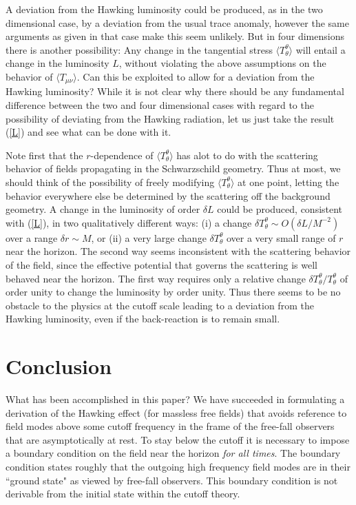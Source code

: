 \documentclass[12pt]{article}
\def\la{\langle}
\def\ra{\rangle}
\begin{document}
A deviation from the Hawking luminosity could be produced,
as in the two dimensional case, by a deviation from the
usual trace anomaly, however the same arguments as given
in that case make this seem unlikely. But in four dimensions
there is another possibility: Any change in
the tangential stress $\la T_\theta^\theta\ra$ will entail
a change in the luminosity $L$, without violating the above
assumptions on the behavior of $\la T_{\mu\nu}\ra$.
Can this be exploited to allow for a deviation from the Hawking
luminosity? While it is not clear why there should be any fundamental
difference between the two and four dimensional cases with regard
to the possibility of deviating from the Hawking radiation, let us
just take the result (\ref{L}) and see what can be done with it.

Note first that the $r$-dependence of $\la T_\theta^\theta\ra$
has alot to do with the scattering behavior of fields propagating in
the Schwarzschild geometry. Thus at most, we should think of the
possibility of freely modifying $\la T_\theta^\theta\ra$ at one
point, letting the behavior everywhere else be determined by
the scattering off the background geometry.
A change in the luminosity of order $\delta L$
could be produced, consistent with (\ref{L}),
in two qualitatively different
ways: (i) a change $\delta T_\theta^\theta\sim
O(\delta L/M^{-2})$ over a range $\delta r\sim M$,
or (ii) a very large change $\delta T_\theta^\theta$
over a very small range of $r$ near the horizon.
The second way seems inconsistent with the scattering
behavior of the field, since the effective potential that governs
the scattering is well behaved near the horizon. The first way
requires only a relative change
$\delta T_\theta^\theta/T_\theta^\theta$
of order unity to change the luminosity by order unity.
Thus there seems to be no obstacle to the physics at the cutoff
scale leading to a deviation from the Hawking luminosity, even if
the back-reaction is to remain small.

\section{Conclusion}
\label{sec:7}

What has been accomplished in this paper? We have
succeeded in formulating a derivation of the Hawking
effect (for massless free fields) that avoids reference
to field modes above some
cutoff frequency in the frame of the free-fall
observers that are asymptotically at rest. To stay
below the cutoff it is necessary to impose a
boundary condition on the field  near the horizon {\it for all
times}. The boundary condition states roughly that the
outgoing high frequency field modes are in their ``ground
state" as viewed by free-fall observers.
This boundary condition is not derivable from
the initial state within the cutoff theory.
\end{document}
